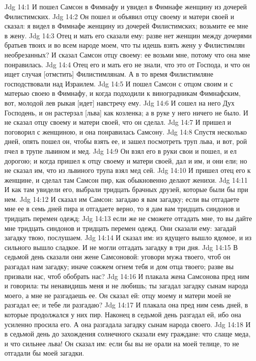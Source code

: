 Jdg 14:1  И пошел Самсон в Фимнафу и увидел в Фимнафе женщину из дочерей Филистимских.
Jdg 14:2  Он пошел и объявил отцу своему и матери своей и сказал: я видел в Фимнафе женщину из дочерей Филистимских; возьмите ее мне в жену.
Jdg 14:3  Отец и мать его сказали ему: разве нет женщин между дочерями братьев твоих и во всем народе моем, что ты идешь взять жену у Филистимлян необрезанных? И сказал Самсон отцу своему: ее возьми мне, потому что она мне понравилась.
Jdg 14:4  Отец его и мать его не знали, что это от Господа, и что он ищет случая [отмстить] Филистимлянам. А в то время Филистимляне господствовали над Израилем.
Jdg 14:5  И пошел Самсон с отцом своим и с матерью своею в Фимнафу, и когда подходили к виноградникам Фимнафским, вот, молодой лев рыкая [идет] навстречу ему.
Jdg 14:6  И сошел на него Дух Господень, и он растерзал [льва] как козленка; а в руке у него ничего не было. И не сказал отцу своему и матери своей, что он сделал.
Jdg 14:7  И пришел и поговорил с женщиною, и она понравилась Самсону.
Jdg 14:8  Спустя несколько дней, опять пошел он, чтобы взять ее, и зашел посмотреть труп льва, и вот, рой пчел в трупе львином и мед.
Jdg 14:9  Он взял его в руки свои и пошел, и ел дорогою; и когда пришел к отцу своему и матери своей, дал и им, и они ели; но не сказал им, что из львиного трупа взял мед сей.
Jdg 14:10  И пришел отец его к женщине, и сделал там Самсон пир, как обыкновенно делают женихи.
Jdg 14:11  И как там увидели его, выбрали тридцать брачных друзей, которые были бы при нем.
Jdg 14:12  И сказал им Самсон: загадаю я вам загадку; если вы отгадаете мне ее в семь дней пира и отгадаете верно, то я дам вам тридцать синдонов и тридцать перемен одежд;
Jdg 14:13  если же не сможете отгадать мне, то вы дайте мне тридцать синдонов и тридцать перемен одежд. Они сказали ему: загадай загадку твою, послушаем.
Jdg 14:14  И сказал им: из ядущего вышло ядомое, и из сильного вышло сладкое. И не могли отгадать загадку в три дня.
Jdg 14:15  В седьмой день сказали они жене Самсоновой: уговори мужа твоего, чтоб он разгадал нам загадку; иначе сожжем огнем тебя и дом отца твоего; разве вы призвали нас, чтоб обобрать нас?
Jdg 14:16  И плакала жена Самсонова пред ним и говорила: ты ненавидишь меня и не любишь; ты загадал загадку сынам народа моего, а мне не разгадаешь ее. Он сказал ей: отцу моему и матери моей не разгадал ее; и тебе ли разгадаю?
Jdg 14:17  И плакала она пред ним семь дней, в которые продолжался у них пир. Наконец в седьмой день разгадал ей, ибо она усиленно просила его. А она разгадала загадку сынам народа своего.
Jdg 14:18  И в седьмой день до захождения солнечного сказали ему граждане: что слаще меда, и что сильнее льва! Он сказал им: если бы вы не орали на моей телице, то не отгадали бы моей загадки.
